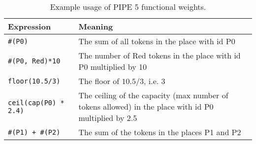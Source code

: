 
\begin{table}[tb]
\begin{center}
  \begin{tabular}{| l | p{10cm} |}
    \hline
    Expression & Meaning \\ 
    \hline
    \texttt{\#(P0)} & The sum of all tokens in the place with id P0 \\
    
    
    \hline
    \texttt{\#(P0, Red)*10} & The number of Red tokens in the place with id P0 multiplied by 10\\
    
    \hline
    \texttt{floor(10.5/3)} & The floor of $10.5/3$, i.e. $3$\\
    
    \hline
    \texttt{ceil(cap(P0) * 2.4)} & The ceiling of the capacity (max number of tokens allowed) in the place with id P0 multiplied by 2.5 \\


    \hline
    \texttt{\#(P1) + \#(P2)} & The sum of the tokens in the places P1 and P2 \\
    \hline

  \end{tabular}
\caption{Example usage of PIPE 5 functional weights.}
\label{tbl:functional_weights}
\end{center}
\end{table}
